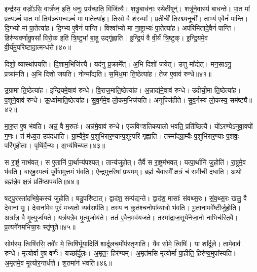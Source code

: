 इन्द्र॑स्य॒ वज्रो॑ऽसि॒ वार्त्र॑घ्न॒ इति॒ धनुः॒ प्रय॑च्छति॒ विजि॑त्यै।
श॒त्रु॒बाध॑नाः॒ स्थेतीषून्॑।
शत्रू॑ने॒वास्य॑ बाधन्ते।
पा॒त मा᳚ प्र॒त्यञ्चं॑ पा॒त मा॑ ति॒र्यञ्च॑म॒न्वञ्चं॑ मा पा॒तेत्या॑ह।
ति॒स्रो वै श॑र॒व्याः᳚।
प्र॒तीची॑ ति॒रश्च्य॒नूची᳚।
ताभ्य॑ ए॒वैनं॑ पान्ति।
दि॒ग्भ्यो मा॑ पा॒तेत्या॑ह।
दि॒ग्भ्य ए॒वैनं॑ पान्ति।
विश्वा᳚भ्यो मा ना॒ष्ट्राभ्यः॑ पा॒तेत्या॑ह।
अप॑रिमितादे॒वैनं॑ पान्ति।
हिर॑ण्यवर्णावु॒षसां᳚ विरो॒क इति॑ त्रि॒ष्टुभा॑ बा॒हू उद्गृ॑ह्णाति।
इ॒न्द्रि॒यं वै वी॒र्यं॑ त्रि॒ष्टुक्।
इ॒न्द्रि॒यमे॒व वी॒र्य॑मु॒परि॑ष्टादा॒त्मन्ध॑त्ते॥४०॥\anuvakamend[व्यावृ॑त्त्यै दा॒त्रम॒सीत्या॑हा॒मृत॒ꣳ॒ हिर॑ण्यमेकश॒तो ग॑मय॒न्त्याह॑ ब्राह्म॒णा ना॒ष्ट्राभ्यः॑ पा॒तेत्या॑ह च॒त्वारि॑ च]

दिशो॒ व्यास्था॑पयति।
दि॒शाम॒भिजि॑त्त्यै।
यद॑नु प्र॒क्रामे᳚त्।
अ॒भि दिशो॑ जयेत्।
उत्तु मा᳚द्येत्।
मन॒साऽनु॒ प्रक्रा॑मति।
अ॒भि दिशो॑ जयति।
नोन्मा᳚द्यति।
स॒मिध॒मा ति॒ष्ठेत्या॑ह।
तेज॑ ए॒वाव॑ रुन्धे॥४१॥

उ॒ग्रामा ति॒ष्ठेत्या॑ह।
इ॒न्द्रि॒यमे॒वाव॑ रुन्धे।
वि॒राज॒माति॒ष्ठेत्या॑ह।
अ॒न्नाद्य॑मे॒वाव॑ रुन्धे।
उदी॑ची॒मा ति॒ष्ठेत्या॑ह।
प॒शूने॒वाव॑ रुन्धे।
ऊ॒र्ध्वामाति॒ष्ठेत्या॑ह।
सु॒व॒र्गमे॒व लो॒कम॒भिज॑यति।
अनूज्जि॑हीते।
सु॒व॒र्गस्य॑ लो॒कस्य॒ सम॑ष्ट्यै॥४२॥

मा॒रु॒त ए॒ष भ॑वति।
अन्नं॒ वै म॒रुतः॑।
अन्न॑मे॒वाव॑ रुन्धे।
एक॑विꣳशतिकपालो भवति॒ प्रति॑\-ष्ठित्यै।
यो॑ऽरण्ये\-ऽनुवा॒क्यो॑ ग॒णः।
तं म॑ध्य॒त उप॑दधाति।
ग्रा॒म्यैरे॒व प॒शुभि॑रार॒ण्यान्प॒शू\-न्परि॑ गृह्णाति।
तस्मा᳚द्ग्रा॒म्यैः प॒शुभि॑रार॒ण्याः प॒शवः॒ परि॑गृहीताः।
पृथि॑र्वै॒न्यः।
अ॒भ्य॑षिच्यत॥४३॥

स रा॒ष्ट्रं नाभ॑वत्।
स ए॒तानि॑ पा॒र्थान्य॑पश्यत्।
तान्य॑जुहोत्।
तैर्वै स रा॒ष्ट्रम॑भवत्।
यत्पा॒र्थानि॑ जु॒होति॑।
रा॒ष्ट्रमे॒व भ॑वति।
बा॒र्॒ह॒स्प॒त्यं पूर्वे॑षामुत्त॒मं भ॑वति।
ऐ॒न्द्रमुत्त॑रेषां प्रथ॒मम्।
ब्रह्म॑ चै॒वास्मै᳚ क्ष॒त्रं च॑ स॒मीची॑ दधाति।
अथो॒ ब्रह्म॑न्ने॒व क्ष॒त्रं प्रति॑\-ष्ठापयति॥४४॥

षट्पु॒रस्ता॑दभिषे॒कस्य॑ जुहोति।
षडु॒परि॑ष्टात्।
द्वाद॑श॒ सम्प॑द्यन्ते।
द्वाद॑श॒ मासाः᳚ संवथ्स॒रः।
सं॒व॒थ्स॒रः खलु॒ वै दे॒वानां॒ पूः।
दे॒वाना॑मे॒व पुरं॑ मध्य॒तो व्यव॑सर्पति।
तस्य॒ न कुत॑श्च॒नोपा᳚व्या॒धो भ॑वति।
भू॒ताना॒मवे᳚ष्टीर्जुहोति।
अत्रा᳚त्र॒ वै मृ॒त्युर्जा॑यते।
यत्र॑यत्रै॒व मृ॒त्युर्जाय॑ते।
तत॑ ए॒वैन॒मव॑यजते।
तस्मा᳚द्राज॒सूये॑नेजा॒नो नाभिच॑रित॒वै।
प्र॒त्यगे॑नमभिचा॒रः स्तृ॑णुते॥४५॥\anuvakamend[रु॒न्धे॒ सम॑ष्ट्या असिच्यत स्थापयति॒ जाय॑ते॒ पञ्च॑ च]

सोम॑स्य॒ त्विषि॑रसि॒ तवे॑व मे॒ त्विषि॑र्भूया॒दिति॑ शार्दूल\-च॒र्मोप॑स्तृणाति।
यैव सोमे॒ त्विषिः॑।
या शा᳚र्दू॒ले।
तामे॒वाव॑ रुन्धे।
मृ॒त्योर्वा ए॒ष वर्णः॑।
यच्छा᳚र्दू॒लः।
अ॒मृत॒ꣳ॒ हिर॑ण्यम्।
अ॒मृत॑मसि मृ॒त्योर्मा॑ पा॒हीति॒ हिर॑ण्य॒मुपा᳚स्यति।
अ॒मृत॑मे॒व मृ॒त्योर॒न्तर्ध॑त्ते।
श॒तमा॑नं भवति॥४६॥

